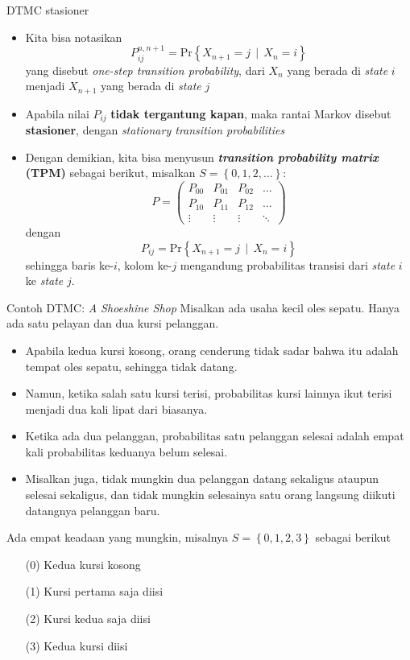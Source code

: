 \documentclass{beamer}
\newcommand{\braces}[1]{\left\{#1\right\}}
\begin{document}
\begin{frame}{DTMC stasioner}
    \begin{itemize}
        \item Kita bisa notasikan
        \[ P_{ij}^{n,n+1} = \text{Pr}\braces{X_{n+1} = j \, \mid \, X_n = i} \]
        yang disebut \textit{one-step transition probability}, dari \(X_n\) yang berada di \textit{state} \(i\) menjadi \(X_{n+1}\) yang berada di \textit{state} \(j\)
        \item Apabila nilai \(P_{ij}\) \textbf{tidak tergantung kapan}, maka rantai Markov disebut \textbf{stasioner}, dengan \textit{stationary transition probabilities}
        \item Dengan demikian, kita bisa menyusun \textbf{\textit{transition probability matrix} (TPM)} sebagai berikut, misalkan \(S=\braces{0,1,2,\dots}\):
        \[ P = \begin{pmatrix}
            P_{00} & P_{01} & P_{02} & \dots \\
            P_{10} & P_{11} & P_{12} & \dots \\
            \vdots & \vdots & \vdots & \ddots
        \end{pmatrix} \]
        dengan
        \[ P_{ij} = \text{Pr}\braces{X_{n+1} = j \, \mid \, X_n = i} \]
        sehingga baris ke-\(i\), kolom ke-\(j\) mengandung probabilitas transisi dari \textit{state} \(i\) ke \textit{state} \(j\).
    \end{itemize}
\end{frame}

\begin{frame}{Contoh DTMC: \textit{A Shoeshine Shop}}
    Misalkan ada usaha kecil oles sepatu. Hanya ada satu pelayan dan dua kursi pelanggan.
    \begin{itemize}
        \item Apabila kedua kursi kosong, orang cenderung tidak sadar bahwa itu adalah tempat oles sepatu, sehingga tidak datang.
        \item Namun, ketika salah satu kursi terisi, probabilitas kursi lainnya ikut terisi menjadi dua kali lipat dari biasanya.
        \item Ketika ada dua pelanggan, probabilitas satu pelanggan selesai adalah empat kali probabilitas keduanya belum selesai.
        \item Misalkan juga, tidak mungkin dua pelanggan datang sekaligus ataupun selesai sekaligus, dan tidak mungkin selesainya satu orang langsung diikuti datangnya pelanggan baru.
    \end{itemize}

    Ada empat keadaan yang mungkin, misalnya \( S = \braces{0,1,2,3} \) sebagai berikut
    \begin{enumerate}
        \item[(0)] Kedua kursi kosong
        \item[(1)] Kursi pertama saja diisi
        \item[(2)] Kursi kedua saja diisi
        \item[(3)] Kedua kursi diisi
    \end{enumerate}
\end{frame}
\end{document}
